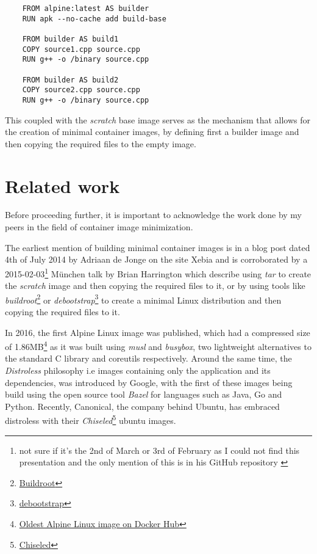 \lstset{language=Dockerfile,caption=Sample Multi-stage Dockerfile,label=lst:ex-multi-stage-dockerifle}
\begin{lstlisting}
    FROM alpine:latest AS builder
    RUN apk --no-cache add build-base
    
    FROM builder AS build1
    COPY source1.cpp source.cpp
    RUN g++ -o /binary source.cpp
    
    FROM builder AS build2
    COPY source2.cpp source.cpp
    RUN g++ -o /binary source.cpp   
\end{lstlisting}

This coupled with the \textit{scratch} base image serves as the mechanism that allows for the creation of minimal container images, by defining first a 
builder image and then copying the required files to the empty image.

\section{Related work}
\label{sec:related-work}

Before proceeding further, it is important to acknowledge the work done by 
my peers in the field of container image minimization.

The earliest mention of building minimal container images is in a blog post dated 4th of July 2014 by
Adriaan de Jonge on the site Xebia \cite{xebia-post} and is corroborated by a 
2015-02-03\footnote{not sure if it's the 2nd of March or 3rd of February as I could not find this presentation and the only mention of this is in his GitHub repository \cite{minimal-containers-101}} München talk by Brian Harrington \cite{minimal-containers-101}
which describe using \textit{tar} to create the \textit{scratch} image and then copying the required files to it, or by using 
tools like \textit{buildroot}\footnote{\href{https://buildroot.org/}{Buildroot}} or \textit{debootstrap}\footnote{\href{https://wiki.debian.org/Debootstrap}{debootstrap}} to create a minimal Linux distribution and then copying the required files to it.

In 2016, the first Alpine Linux image was published, which had a compressed size of 1.86MB\footnote{\href{https://hub.docker.com/layers/library/alpine/2.6/images/sha256-e9cec9aec697d8b9d450edd32860ecd363f2f3174c8338beb5f809422d182c63}{Oldest Alpine Linux image on Docker Hub}} as it
was built using \textit{musl} and \textit{busybox}, two lightweight alternatives to the standard C library and coreutils respectively.
Around the same time, the \textit{Distroless} philosophy i.e images containing only the application and its dependencies, was introduced by Google, with the 
first of these images being build using the open source tool \textit{Bazel} for languages such as Java, Go and Python.
Recently, Canonical, the company behind Ubuntu, has embraced distroless with their \textit{Chiseled}\footnote{
    \href{https://ubuntu.com/containers/chiseled}{Chiseled}
} ubuntu images.

